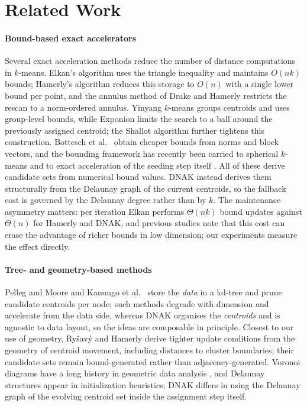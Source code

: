 \documentclass[review,12pt]{elsarticle}
\begin{document}
\section{Related Work}
\label{sec:related}

\paragraph{Bound-based exact accelerators}
Several exact acceleration methods reduce the number of distance
computations in $k$-means. Elkan's algorithm \cite{elkan} uses the
triangle inequality and maintains $O(nk)$ bounds; Hamerly's algorithm
\cite{hamerly} reduces this storage to $O(n)$ with a single lower
bound per point, and the annulus method of Drake and Hamerly
\cite{drake} restricts the rescan to a norm-ordered annulus. Yinyang
$k$-means \cite{yinyang} groups centroids and uses group-level bounds,
while Exponion \cite{newling} limits the search to a ball around the
previously assigned centroid; the Shallot algorithm \cite{borgelt}
further tightens this construction. Bottesch et al.\ \cite{bottesch}
obtain cheaper bounds from norms and block vectors, and the bounding
framework has recently been carried to spherical $k$-means
\cite{schubert} and to exact acceleration of the seeding step itself
\cite{raff,corominas}. All of these derive candidate sets from
numerical bound values. DNAK instead derives them structurally from
the Delaunay graph of the current centroids, so the fallback cost is
governed by the Delaunay degree rather than by $k$. The maintenance
asymmetry matters: per iteration Elkan performs $\Theta(nk)$ bound
updates against $\Theta(n)$ for Hamerly and DNAK, and previous studies
\cite{hamerlydrake,wang21} note that this cost can erase the advantage
of richer bounds in low dimension; our experiments measure the effect
directly.

\paragraph{Tree- and geometry-based methods}
Pelleg and Moore \cite{pelleg} and Kanungo et al.\ \cite{kanungo}
store the \emph{data} in a kd-tree and prune candidate centroids per
node; such methods degrade with dimension and accelerate from the data
side, whereas DNAK organises the \emph{centroids} and is agnostic to
data layout, so the ideas are composable in principle. Closest to our
use of geometry, Ry\v{s}av\'{y} and Hamerly \cite{rysavy} derive
tighter update conditions from the geometry of centroid movement,
including distances to cluster boundaries; their candidate sets remain
bound-generated rather than adjacency-generated. Voronoi diagrams have
a long history in geometric data analysis \cite{aurenhammer}, and
Delaunay structures appear in initialization heuristics; DNAK differs
in using the Delaunay graph of the evolving centroid set inside the
assignment step itself.
\end{document}
